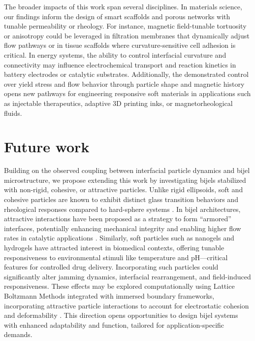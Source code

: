 The broader impacts of this work span several disciplines. In materials science, our findings inform the design of smart scaffolds and porous 
networks with tunable permeability or rheology. For instance, magnetic field-tunable tortuosity or anisotropy could be leveraged in filtration 
membranes that dynamically adjust flow pathways or in tissue scaffolds where curvature-sensitive cell adhesion is critical. In energy systems, 
the ability to control interfacial curvature and connectivity may influence electrochemical transport and reaction kinetics in battery electrodes 
or catalytic substrates. Additionally, the demonstrated control over yield stress and flow behavior through particle shape and magnetic history 
opens new pathways for engineering responsive soft materials in applications such as injectable therapeutics, adaptive 3D printing inks, or 
magnetorheological fluids.

\section{Future work}

Building on the observed coupling between interfacial particle dynamics and bijel microstructure, we propose extending 
this work by investigating bijels stabilized with non-rigid, cohesive, or attractive particles. Unlike rigid ellipsoids, 
soft and cohesive particles are known to exhibit distinct glass transition behaviors and rheological responses compared 
to hard-sphere systems \cite{weeks_introduction_2017, torquato_jammed_2010}. In bijel architectures, attractive interactions have been 
proposed as a strategy to form “armored” interfaces, potentially enhancing mechanical integrity and enabling higher flow rates in catalytic 
applications \cite{boakye-ansah_controlling_2020}. 
Similarly, soft particles such as nanogels and hydrogels have attracted interest in biomedical contexts, offering tunable responsiveness 
to environmental stimuli like temperature and pH—critical features for controlled drug delivery. Incorporating such particles 
could significantly alter jamming dynamics, interfacial rearrangement, and field-induced responsiveness. These effects may be 
explored computationally using Lattice Boltzmann Methods integrated with immersed boundary frameworks, incorporating attractive
particle  interactions to account for electrostatic cohesion and deformability \cite{silva_lattice_2024}. This direction opens opportunities 
to design bijel systems with enhanced adaptability and function, tailored for application-specific demands.

